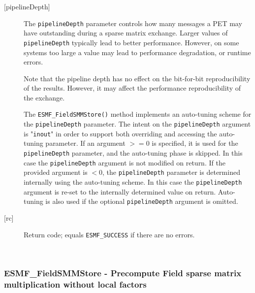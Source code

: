 \begin{description}
     \item [{[pipelineDepth]}]
       The {\tt pipelineDepth} parameter controls how many messages a PET
       may have outstanding during a sparse matrix exchange. Larger values
       of {\tt pipelineDepth} typically lead to better performance. However,
       on some systems too large a value may lead to performance degradation,
       or runtime errors.
  
       Note that the pipeline depth has no effect on the bit-for-bit
       reproducibility of the results. However, it may affect the performance
       reproducibility of the exchange.
  
       The {\tt ESMF\_FieldSMMStore()} method implements an auto-tuning scheme
       for the {\tt pipelineDepth} parameter. The intent on the
       {\tt pipelineDepth} argument is "{\tt inout}" in order to
       support both overriding and accessing the auto-tuning parameter.
       If an argument $>= 0$ is specified, it is used for the
       {\tt pipelineDepth} parameter, and the auto-tuning phase is skipped.
       In this case the {\tt pipelineDepth} argument is not modified on
       return. If the provided argument is $< 0$, the {\tt pipelineDepth}
       parameter is determined internally using the auto-tuning scheme. In this
       case the {\tt pipelineDepth} argument is re-set to the internally
       determined value on return. Auto-tuning is also used if the optional
       {\tt pipelineDepth} argument is omitted.
  
     \item [{[rc]}]  
       Return code; equals {\tt ESMF\_SUCCESS} if there are no errors.
  
   \end{description} 
    
 
\mbox{}\hrulefill\ 
 
\subsubsection [ESMF\_FieldSMMStore] {ESMF\_FieldSMMStore - Precompute Field sparse matrix multiplication without local factors}


